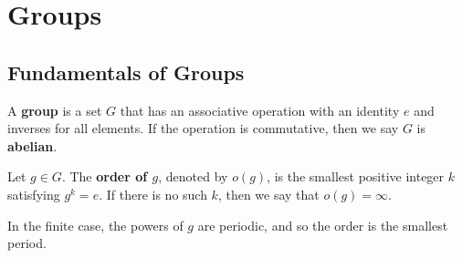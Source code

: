 \documentclass{memoir}
\begin{document}
\chapter{Groups}
\label{cha:groups}

\section{Fundamentals of Groups}
\label{sec:fundamentals_of_group_theory}

\begin{defn}[Group]
	A \textbf{group} is a set \(G\) that has an associative operation with an identity \(e\) and inverses for all elements. If the operation is commutative, then we say \(G\) is \textbf{abelian}.
\end{defn}

\begin{defn}[Order]
	Let \(g \in G\). The \textbf{order of \(g\)}, denoted by \(o(g)\), is the smallest positive integer \(k\) satisfying \(g^{k}=e\). If there is no such \(k\), then we say that \(o(g) = \infty\).
\end{defn}
In the finite case, the powers of \(g\) are periodic, and so the order is the smallest period. \\

	
\end{document}
